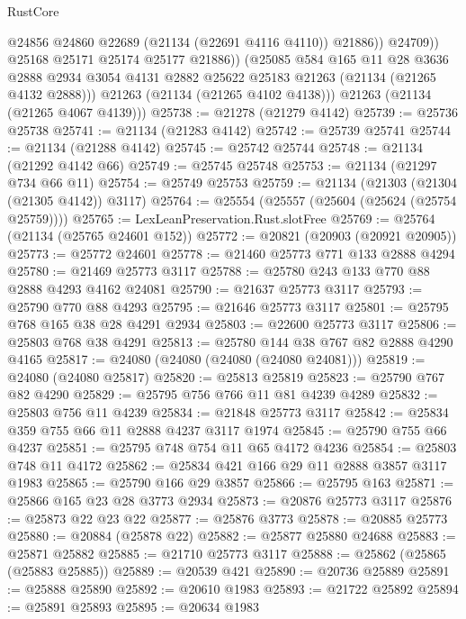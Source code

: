 \begin{lexlean}{RustCore}
\begin{coremodule}
                    @24856
                    @24860
                    @22689
                    (@21134 (@22691 @4116 @4110))
                    @21886))
                @24709))
            @25168
            @25171
            @25174
            @25177
            @21886))
        (@25085
          @584
          @165
          @11
          @28
          @3636
          @2888
          @2934
          @3054
          @4131
          @2882
          @25622
          @25183
          @21263
          (@21134 (@21265 @4132 @2888)))
        @21263
        (@21134 (@21265 @4102 @4138)))
      @21263
      (@21134 (@21265 @4067 @4139)))
@25738 := @21278 (@21279 @4142)
@25739 := @25736 @25738
@25741 := @21134 (@21283 @4142)
@25742 := @25739 @25741
@25744 := @21134 (@21288 @4142)
@25745 := @25742 @25744
@25748 := @21134 (@21292 @4142 @66)
@25749 := @25745 @25748
@25753 := @21134 (@21297 @734 @66 @11)
@25754 := @25749 @25753
@25759 := @21134 (@21303 (@21304 (@21305 @4142)) @3117)
@25764 := @25554 (@25557 (@25604 (@25624 (@25754 @25759))))
@25765 := LexLeanPreservation.Rust.slotFree
@25769 := @25764 (@21134 (@25765 @24601 @152))
@25772 := @20821 (@20903 (@20921 @20905))
@25773 := @25772 @24601
@25778 := @21460 @25773 @771 @133 @2888 @4294
@25780 := @21469 @25773 @3117
@25788 := @25780 @243 @133 @770 @88 @2888 @4293 @4162 @24081
@25790 := @21637 @25773 @3117
@25793 := @25790 @770 @88 @4293
@25795 := @21646 @25773 @3117
@25801 := @25795 @768 @165 @38 @28 @4291 @2934
@25803 := @22600 @25773 @3117
@25806 := @25803 @768 @38 @4291
@25813 := @25780 @144 @38 @767 @82 @2888 @4290 @4165
@25817 := @24080 (@24080 (@24080 (@24080 @24081)))
@25819 := @24080 (@24080 @25817)
@25820 := @25813 @25819
@25823 := @25790 @767 @82 @4290
@25829 := @25795 @756 @766 @11 @81 @4239 @4289
@25832 := @25803 @756 @11 @4239
@25834 := @21848 @25773 @3117
@25842 := @25834 @359 @755 @66 @11 @2888 @4237 @3117 @1974
@25845 := @25790 @755 @66 @4237
@25851 := @25795 @748 @754 @11 @65 @4172 @4236
@25854 := @25803 @748 @11 @4172
@25862 := @25834 @421 @166 @29 @11 @2888 @3857 @3117 @1983
@25865 := @25790 @166 @29 @3857
@25866 := @25795 @163
@25871 := @25866 @165 @23 @28 @3773 @2934
@25873 := @20876 @25773 @3117
@25876 := @25873 @22 @23 @22
@25877 := @25876 @3773
@25878 := @20885 @25773
@25880 := @20884 (@25878 @22)
@25882 := @25877 @25880 @24688
@25883 := @25871 @25882
@25885 := @21710 @25773 @3117
@25888 := @25862 (@25865 (@25883 @25885))
@25889 := @20539 @421
@25890 := @20736 @25889
@25891 := @25888 @25890
@25892 := @20610 @1983
@25893 := @21722 @25892
@25894 := @25891 @25893
@25895 := @20634 @1983

\end{coremodule}
\end{lexlean}
